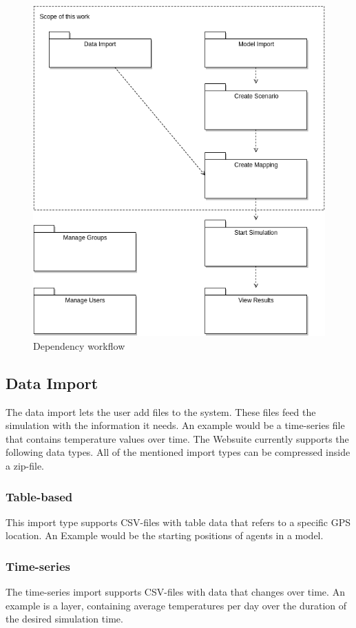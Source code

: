 \begin{figure}[H]
	\centering\includegraphics[width=.7\textwidth]{res/Dependency-workflow}
	\caption{Dependency workflow}
	\label{fig:dependency-workflow}
\end{figure}


\subsection{Data Import}
The data import lets the user add files to the system. These files feed the simulation with the information it needs. An example would be a time-series file that contains temperature values over time. The Websuite currently supports the following data types. All of the mentioned import types can be compressed inside a zip-file.

\subsubsection{Table-based}
This import type supports CSV-files with table data that refers to a specific GPS location. An Example would be the starting positions of agents in a model.

\subsubsection{Time-series}
The time-series import supports CSV-files with data that changes over time. An example is a layer, containing average temperatures per day over the duration of the desired simulation time.

